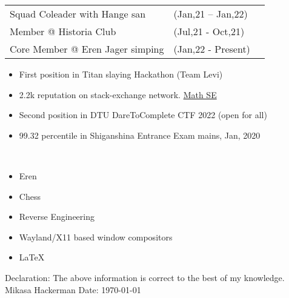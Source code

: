\documentclass[10pt]{extarticle}
\newcommand{\yourname}{Mikasa Hackerman}%
\begin{document}
\vspace{0pt}
\begin{contained}
\begin{longtable}{p{}p{}p{}}
    Squad Coleader with Hange san & (Jan,21 – Jan,22)\\
    Member @ Historia Club & (Jul,21 - Oct,21)\\
    Core Member @ Eren Jager simping & (Jan,22 - Present)\\
\end{longtable}
\vspace{0pt}
\end{contained}
\begin{contained}
\vspace{0pt}
\begin{itemize}
    \setlength\itemsep{0.5pt}
    \item First position in Titan slaying Hackathon (Team Levi)
    \item 2.2k reputation on stack-exchange network. \href{https://math.stackexchange.com/users/811225}{\color{red!70} Math SE}
    \item Second position in DTU DareToComplete CTF 2022 (open for all)
    \item 99.32 percentile in Shiganshina Entrance Exam mains, Jan, 2020
\end{itemize}
\vspace{0pt}
\end{contained}
\begin{contained}\\
\begin{itemize}
    \setlength\itemsep{0.5pt}
    \item Eren
    \item Chess
    \item Reverse Engineering
    \item Wayland/X11 based window compositors
    \item \LaTeX
\end{itemize}
\end{contained}
Declaration: The above information is correct to the best of my knowledge.\newline
\yourname\newline
Date: \today
\end{document}
